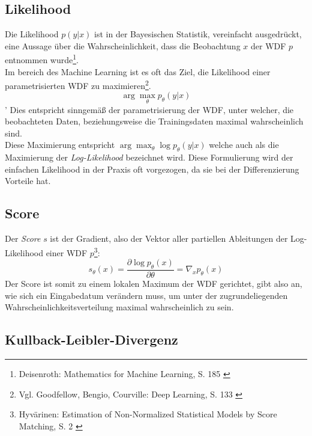 \subsection{Likelihood}

Die Likelihood $p(y|x)$ ist in der Bayesischen Statistik, vereinfacht ausgedrückt, eine Aussage über die Wahrscheinlichkeit, dass die Beobachtung $x$ der WDF $p$ entnommen wurde\footnote{
    Deisenroth: Mathematics for Machine Learning, S. 185
    \cite{Deisenroth2020}
}. \\
Im bereich des Machine Learning ist es oft das Ziel, die Likelihood einer parametrisierten WDF zu maximieren\footnote{
    Vgl. Goodfellow, Bengio, Courville: Deep Learning, S. 133
    \cite{Goodfellow-et-al-2016}
}. 
\begin{equation}
    \arg\max_\theta p_\theta(y|x)
\end{equation}'
Dies entspricht sinngemäß der parametrisierung der WDF, unter welcher, die beobachteten Daten, beziehungsweise die Trainingsdaten maximal wahrscheinlich sind. \\
Diese Maximierung entspricht $\arg\max_\theta \log p_\theta(y|x)$ welche auch als die Maximierung der \textit{Log-Likelihood} bezeichnet wird. Diese Formulierung wird der einfachen Likelihood in der Praxis oft vorgezogen, da sie bei der Differenzierung Vorteile hat.

\subsection{Score}

Der \textit{Score} $s$ ist der Gradient, also der Vektor aller partiellen Ableitungen der Log-Likelihood einer WDF $p$\footnote{
    Hyvärinen: Estimation of Non-Normalized Statistical Models by Score Matching, S. 2
    \cite{JMLR:v6:hyvarinen05a}
}: 
\begin{equation}
    s_\theta(x) = \frac{\partial \log p_\theta(x)}{\partial \theta} 
    = \nabla_x p_\theta(x)
\end{equation}
Der Score ist somit zu einem lokalen Maximum der WDF gerichtet, gibt also an, wie sich ein Eingabedatum verändern muss, um unter der zugrundeliegenden Wahrscheinlichkeitsverteilung maximal wahrscheinlich zu sein.

\subsection{Kullback-Leibler-Divergenz}

